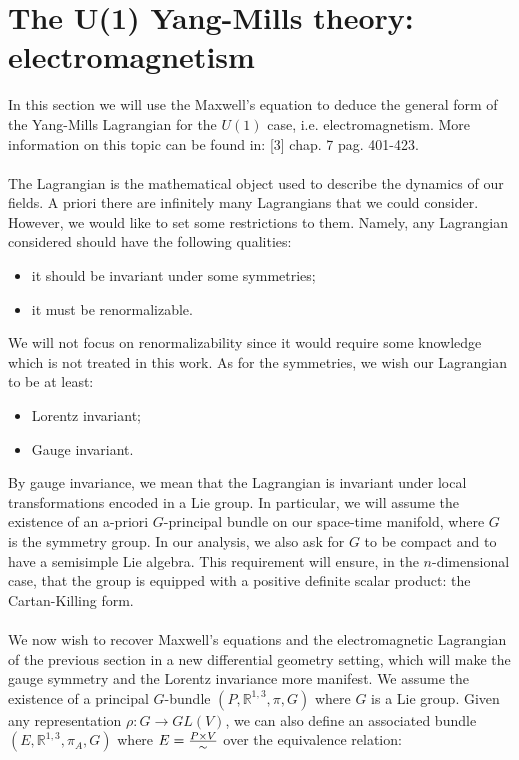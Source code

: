 \documentclass[12pt,a4paper]{report}
\theoremstyle{definition}
\theoremstyle{Theorem}
\theoremstyle{definition}
\theoremstyle{definition}
\begin{document}
	\section{The U(1) Yang-Mills theory: electromagnetism}
	In this section we will use the Maxwell's equation to deduce the general form of the Yang-Mills Lagrangian for the $U(1)$ case, i.e. electromagnetism. More information on this topic can be found in: [3] chap. 7 pag. 401-423.
	\\\\
	The Lagrangian is the mathematical object used to describe the dynamics of our fields. A priori there are infinitely many Lagrangians that we could consider. However, we would like to set some restrictions to them. Namely, any Lagrangian considered should have the following qualities:
	\begin{itemize}
		\item it should be invariant under some symmetries;
		\item it must be renormalizable.
	\end{itemize}
	We will not focus on renormalizability since it would require some knowledge which is not treated in this work. As for the symmetries, we wish our Lagrangian to be at least:
	\begin{itemize}
		\item Lorentz invariant;
		\item Gauge invariant.
	\end{itemize}
	By gauge invariance, we mean that the Lagrangian is invariant under local transformations encoded in a Lie group. In particular, we will assume the existence of an a-priori $G$-principal bundle on our space-time manifold, where $G$ is the symmetry group. In our analysis, we also ask for $G$ to be compact and to have a semisimple Lie algebra. This requirement will ensure, in the $n$-dimensional case, that the group is equipped with a positive definite scalar product: the Cartan-Killing form.
	\\\\
	We now wish to recover Maxwell's equations and the electromagnetic Lagrangian of the previous section in a new differential geometry setting, which will make the gauge symmetry and the Lorentz invariance more manifest. We assume the existence of a principal $G$-bundle $(P,\mathbb{R}^{1,3},\pi,G)$ where $G$ is a Lie group. Given any representation $\rho:G\rightarrow GL(V)$, we can also define an associated bundle $(E,\mathbb{R}^{1,3},\pi_A,G)$ where $E={P\times V\over \sim}$ over the equivalence relation:
\end{document}
